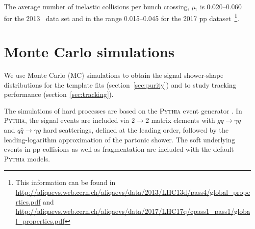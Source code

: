 The average number of inelastic collisions per bunch crossing, $\mu$, is 0.020--0.060 for the 2013 \pPb~data set and in the range 0.015--0.045 for the 2017 pp dataset~\footnote{This information can be found in \url{http://aliqaevs.web.cern.ch/aliqaevs/data/2013/LHC13d/pass4/global_properties.pdf} and \url{http://aliqaevs.web.cern.ch/aliqaevs/data/2017/LHC17q/cpass1_pass1/global_properties.pdf}}.%







\section{Monte Carlo simulations}
\label{sec:mcsimulations}
We use Monte Carlo (MC) simulations to obtain the signal shower-shape distributions for the template fits (section~\ref{sec:purity}) and to study tracking performance (section~\ref{sec:tracking}).

The simulations of hard processes are based on the \textsc{Pythia} event generator \cite{zotero-332}. In \textsc{Pythia}, the signal events are included via $2\to2$ matrix elements with $gq\to\gamma q$ and $q\bar{q}\to\gamma g$ hard scatterings, defined at the leading order, followed by the leading-logarithm approximation of the partonic shower. The soft underlying events in pp collisions as well as fragmentation are included with the default \textsc{Pythia} models. 

